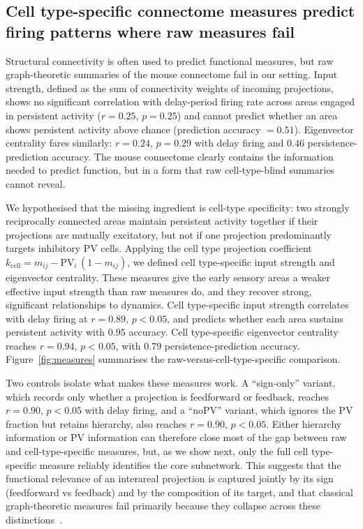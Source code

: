 \documentclass[11pt]{article}
\begin{document}
\subsection{Cell type-specific connectome measures predict firing patterns where raw measures fail}

Structural connectivity is often used to predict functional measures, but raw graph-theoretic summaries of the mouse connectome fail in our setting. Input strength, defined as the sum of connectivity weights of incoming projections, shows no significant correlation with delay-period firing rate across areas engaged in persistent activity ($r=0.25$, $p=0.25$) and cannot predict whether an area shows persistent activity above chance (prediction accuracy $=0.51$). Eigenvector centrality fares similarly: $r=0.24$, $p=0.29$ with delay firing and $0.46$ persistence-prediction accuracy. The mouse connectome clearly contains the information needed to predict function, but in a form that raw cell-type-blind summaries cannot reveal.

We hypothesised that the missing ingredient is cell-type specificity: two strongly reciprocally connected areas maintain persistent activity together if their projections are mutually excitatory, but not if one projection predominantly targets inhibitory PV cells. Applying the cell type projection coefficient $k_{\text{cell}} = m_{ij} - \mathrm{PV}_i\,(1-m_{ij})$, we defined cell type-specific input strength and eigenvector centrality. These measures give the early sensory areas a weaker effective input strength than raw measures do, and they recover strong, significant relationships to dynamics. Cell type-specific input strength correlates with delay firing at $r=0.89$, $p<0.05$, and predicts whether each area sustains persistent activity with $0.95$ accuracy. Cell type-specific eigenvector centrality reaches $r=0.94$, $p<0.05$, with $0.79$ persistence-prediction accuracy. Figure~\ref{fig:measures} summarises the raw-versus-cell-type-specific comparison.

Two controls isolate what makes these measures work. A ``sign-only'' variant, which records only whether a projection is feedforward or feedback, reaches $r=0.90$, $p<0.05$ with delay firing, and a ``noPV'' variant, which ignores the PV fraction but retains hierarchy, also reaches $r=0.90$, $p<0.05$. Either hierarchy information or PV information can therefore close most of the gap between raw and cell-type-specific measures, but, as we show next, only the full cell type-specific measure reliably identifies the core subnetwork. This suggests that the functional relevance of an interareal projection is captured jointly by its sign (feedforward vs feedback) and by the composition of its target, and that classical graph-theoretic measures fail primarily because they collapse across these distinctions~\cite{wang2020macroscopic}.
\end{document}
